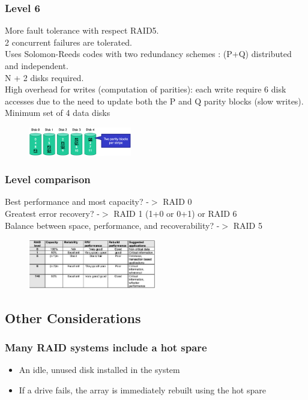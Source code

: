 \documentclass[10pt, oneside]{article}
\begin{document}
\subsubsection{Level 6}
More fault tolerance with respect RAID5.\\
2 concurrent failures are tolerated.\\
Uses Solomon-Reeds codes with two redundancy schemes : (P+Q) distributed and independent.\\
N + 2 disks required.\\
High overhead for writes (computation of parities): each write require 6 disk accesses due to the need to update both the P and Q parity blocks (slow writes).\\
Minimum set of 4 data disks
\begin{figure}[H]
    \begin{center}
    \includegraphics[width=0.4\textwidth]{img/img81.png}
    \end{center}
\end{figure}

\subsubsection{Level comparison}
Best performance and most capacity? -$>$ RAID 0\\
Greatest error recovery? -$>$ RAID 1 (1+0 or 0+1) or RAID 6\\
Balance between space, performance, and recoverability? -$>$ RAID 5\begin{figure}[H]
    \begin{center}
    \includegraphics[width=0.5\textwidth]{img/img82.png}
    \end{center}
\end{figure}

\subsection{Other Considerations}
\subsubsection{Many RAID systems include a hot spare}\begin{itemize}
    \item An idle, unused disk installed in the system
    \item If a drive fails, the array is immediately rebuilt using the hot spare
\end{itemize}
\end{document}
